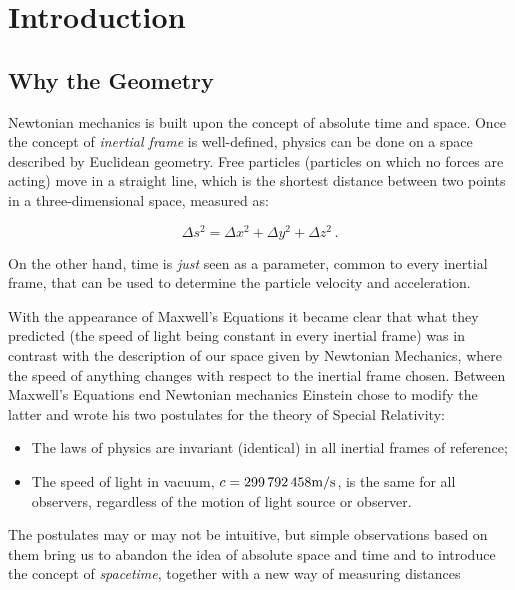 \section{Introduction}

\subsection{Why the \Sh Geometry}

Newtonian mechanics is built upon the concept of absolute time and space.
Once the concept of \textit{inertial frame} is well-defined, physics can be
done on a space described by Euclidean geometry.
Free particles (particles on which no forces are acting) move in a straight
line, which is the shortest distance between two points in a three-dimensional
space, measured as:

\begin{equation}
    \Delta s^2 = \Delta x^2 + \Delta y^2 + \Delta z^2 \, .
    \label{eq:euclide}
\end{equation}

On the other hand, time is \textit{just} seen as a parameter, common to every 
inertial frame, that can be used to determine the particle velocity and
acceleration.

With the appearance of Maxwell's Equations it became clear that what they 
predicted (the speed of light being constant in every inertial frame) was in
contrast with the description of our space given by Newtonian Mechanics, where
the speed of anything changes with respect to the inertial frame chosen.
Between Maxwell's Equations end Newtonian mechanics Einstein chose to modify 
the latter and wrote his two postulates for the theory of Special Relativity:

\begin{itemize}
    \item The laws of physics are invariant (identical) in all inertial frames
        of reference;
    \item The speed of light in vacuum,
        $c = \num{299792458} \unit[per-mode = symbol]{\meter\per\second}$,
        is the same for all observers, regardless of the motion of light source
        or observer.
\end{itemize}

The postulates may or may not be intuitive, but simple observations based on
them bring us to abandon the idea of absolute space and time and to introduce
the concept of \textit{spacetime}, together with a new way of measuring
distances

